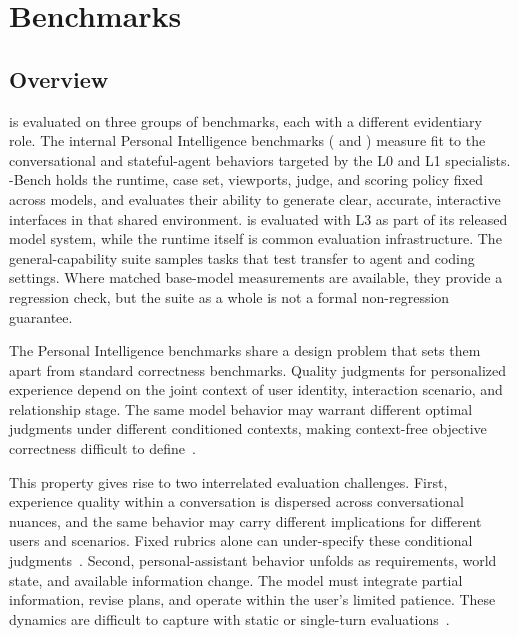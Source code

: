 \section{Benchmarks}
\label{sec:benchmarks}

\subsection{Overview}
\label{sec:bench_overview}

\macaron{} is evaluated on three groups of benchmarks, each with a different evidentiary role. The internal Personal Intelligence benchmarks (\chatbench{} and \livingbench{}) measure fit to the conversational and stateful-agent behaviors targeted by the L0 and L1 specialists. \uifora{}-Bench holds the \uifora{} runtime, case set, viewports, judge, and scoring policy fixed across models, and evaluates their ability to generate clear, accurate, interactive interfaces in that shared environment. \venti{} is evaluated with L3 as part of its released model system, while the runtime itself is common evaluation infrastructure. The general-capability suite samples tasks that test transfer to agent and coding settings. Where matched base-model measurements are available, they provide a regression check, but the suite as a whole is not a formal non-regression guarantee.

The Personal Intelligence benchmarks share a design problem that sets them apart from standard correctness benchmarks. Quality judgments for personalized experience depend on the joint context of user identity, interaction scenario, and relationship stage. The same model behavior may warrant different optimal judgments under different conditioned contexts, making context-free objective correctness difficult to define~\citep{manheim2018,stanfordreglab2025}.

This property gives rise to two interrelated evaluation challenges. First, experience quality within a conversation is dispersed across conversational nuances, and the same behavior may carry different implications for different users and scenarios. Fixed rubrics alone can under-specify these conditional judgments~\citep{thoppilan2022,bowman2021,zheng2023,mehri2020,dubois2024}. Second, personal-assistant behavior unfolds as requirements, world state, and available information change. The model must integrate partial information, revise plans, and operate within the user's limited patience. These dynamics are difficult to capture with static or single-turn evaluations~\citep{raji2021,kiela2021,lin2024,xie2024}.

